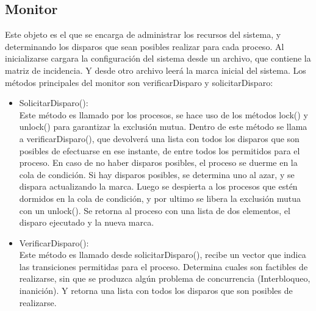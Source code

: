 \documentclass[12pt]{article} %
\begin{document}
\subsection{Monitor}
Este objeto es el que se encarga de administrar los recursos del sistema, y determinando los disparos que sean posibles realizar para cada proceso. 
Al inicializarse cargara la configuración del sistema desde un archivo, que contiene la matriz de incidencia. Y desde otro archivo leerá la marca inicial del sistema.
Los métodos principales del monitor son verificarDisparo y solicitarDisparo:
\begin{itemize}
\item SolicitarDisparo():\\Este método es llamado por los procesos, se hace uso de los métodos lock() y unlock() para garantizar la exclusión mutua.
Dentro de este método se llama a verificarDisparo(), que devolverá una lista con todos los disparos que son posibles de efectuarse en ese instante, de entre todos  los permitidos para el proceso.
En caso de no haber disparos posibles, el proceso se duerme en la cola de condición. Si hay disparos posibles, se determina uno al azar, y se dispara actualizando la marca. Luego se despierta a los procesos que estén dormidos en la cola de condición, y por ultimo se libera la exclusión mutua con un unlock().
Se retorna al proceso con una lista de dos elementos, el disparo ejecutado y la nueva marca.
\item VerificarDisparo():\\Este método es llamado desde solicitarDisparo(), recibe un vector que indica las transiciones permitidas para el proceso. Determina cuales son factibles de realizarse, sin que se produzca algún problema de concurrencia (Interbloqueo, inanición). Y retorna una lista con todos los disparos que son posibles de realizarse.
\end{itemize}
\end{document}
